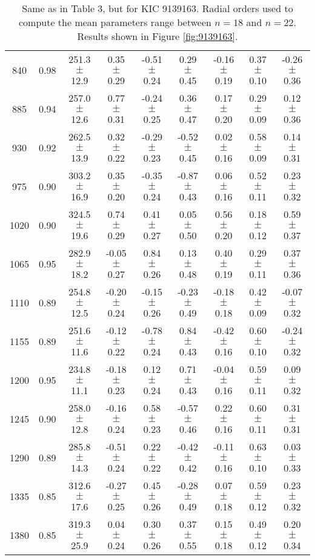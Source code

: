 \documentclass[twocolumn]{aastex61}%
\begin{document}
\begin{table*}[ht]
\begin{tabular}{ccc|ccccc|c}
840 & 0.98 & 251.3 $\pm$ 12.9 & 0.35 $\pm$ 0.29 & -0.51 $\pm$ 0.24 & 0.29 $\pm$ 0.45 & -0.16 $\pm$ 0.19 & 0.37 $\pm$ 0.10 & -0.26 $\pm$ 0.36\\
885 & 0.94 & 257.0 $\pm$ 12.6 & 0.77 $\pm$ 0.31 & -0.24 $\pm$ 0.25 & 0.36 $\pm$ 0.47 & 0.17 $\pm$ 0.20 & 0.29 $\pm$ 0.09 & 0.12 $\pm$ 0.36\\
930 & 0.92 & 262.5 $\pm$ 13.9 & 0.32 $\pm$ 0.22 & -0.29 $\pm$ 0.23 & -0.52 $\pm$ 0.45 & 0.02 $\pm$ 0.16 & 0.58 $\pm$ 0.09 & 0.14 $\pm$ 0.31\\
975 & 0.90 & 303.2 $\pm$ 16.9 & 0.35 $\pm$ 0.20 & -0.35 $\pm$ 0.24 & -0.87 $\pm$ 0.43 & 0.06 $\pm$ 0.16 & 0.52 $\pm$ 0.11 & 0.23 $\pm$ 0.32\\
1020 & 0.90 & 324.5 $\pm$ 19.6 & 0.74 $\pm$ 0.29 & 0.41 $\pm$ 0.27 & 0.05 $\pm$ 0.50 & 0.56 $\pm$ 0.20 & 0.18 $\pm$ 0.12 & 0.59 $\pm$ 0.37\\
1065 & 0.95 & 282.9 $\pm$ 18.2 & -0.05 $\pm$ 0.27 & 0.84 $\pm$ 0.26 & 0.13 $\pm$ 0.48 & 0.40 $\pm$ 0.19 & 0.29 $\pm$ 0.11 & 0.37 $\pm$ 0.36\\
1110 & 0.89 & 254.8 $\pm$ 12.5 & -0.20 $\pm$ 0.24 & -0.15 $\pm$ 0.26 & -0.23 $\pm$ 0.49 & -0.18 $\pm$ 0.18 & 0.42 $\pm$ 0.09 & -0.07 $\pm$ 0.32\\
1155 & 0.89 & 251.6 $\pm$ 11.6 & -0.12 $\pm$ 0.22 & -0.78 $\pm$ 0.24 & 0.84 $\pm$ 0.43 & -0.42 $\pm$ 0.16 & 0.60 $\pm$ 0.10 & -0.24 $\pm$ 0.32\\
1200 & 0.95 & 234.8 $\pm$ 11.1 & -0.18 $\pm$ 0.23 & 0.12 $\pm$ 0.24 & 0.71 $\pm$ 0.43 & -0.04 $\pm$ 0.16 & 0.59 $\pm$ 0.11 & 0.09 $\pm$ 0.32\\
1245 & 0.90 & 258.0 $\pm$ 12.8 & -0.16 $\pm$ 0.24 & 0.58 $\pm$ 0.23 & -0.57 $\pm$ 0.46 & 0.22 $\pm$ 0.16 & 0.60 $\pm$ 0.11 & 0.31 $\pm$ 0.31\\
1290 & 0.89 & 285.8 $\pm$ 14.3 & -0.51 $\pm$ 0.24 & 0.22 $\pm$ 0.22 & -0.42 $\pm$ 0.42 & -0.11 $\pm$ 0.16 & 0.63 $\pm$ 0.10 & 0.03 $\pm$ 0.33\\
1335 & 0.85 & 312.6 $\pm$ 17.6 & -0.27 $\pm$ 0.25 & 0.45 $\pm$ 0.26 & -0.28 $\pm$ 0.49 & 0.07 $\pm$ 0.18 & 0.59 $\pm$ 0.12 & 0.23 $\pm$ 0.32\\
1380 & 0.85 & 319.3 $\pm$ 25.9 & 0.04 $\pm$ 0.24 & 0.30 $\pm$ 0.26 & 0.37 $\pm$ 0.55 & 0.15 $\pm$ 0.18 & 0.49 $\pm$ 0.12 & 0.20 $\pm$ 0.34\\
\end{tabular}
\caption{Same as in Table 3, but for KIC 9139163. Radial orders used to compute the mean parameters range between $n=18$ and $n=22$. Results shown in Figure \ref{fig:9139163}.}\label{tab:9139163}\vspace{-1cm}
\end{table*}
\end{document}

